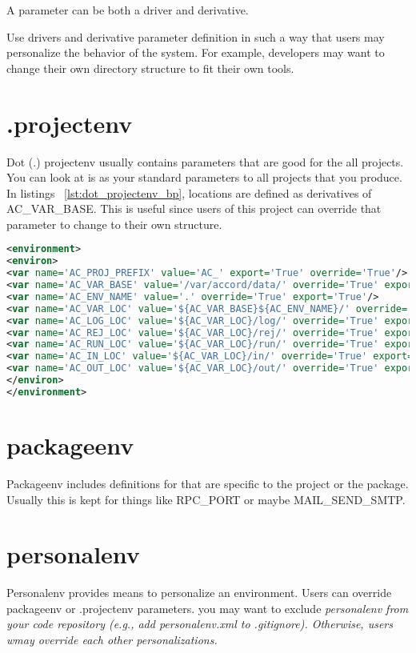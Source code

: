 \documentclass[design.tex]{subfiles}
\begin{document}
A parameter can be both a driver and derivative.

Use drivers and derivative parameter definition in such a way that users may personalize the behavior of the system.  For example, developers may want to change their own directory structure to fit their own tools.
 

\section{.projectenv}
Dot (.) projectenv usually contains parameters that are good for the all projects.  You can look at is as your standard parameters to all projects that you produce. In listings ~\ref{lst:dot_projectenv_bp}, locations are defined as derivatives of AC\_VAR\_BASE. This is useful since users of this project can override that parameter to change to their own structure.

\begin{lstlisting}[language=XML, label=lst:dot_projectenv_bp, caption='.projectenv.xml example']
<environment>
<environ>
<var name='AC_PROJ_PREFIX' value='AC_' export='True' override='True'/>
<var name='AC_VAR_BASE' value='/var/accord/data/' override='True' export='True'/>
<var name='AC_ENV_NAME' value='.' override='True' export='True'/>
<var name='AC_VAR_LOC' value='${AC_VAR_BASE}${AC_ENV_NAME}/' override='True' export='True'/>
<var name='AC_LOG_LOC' value='${AC_VAR_LOC}/log/' override='True' export='True'/>
<var name='AC_REJ_LOC' value='${AC_VAR_LOC}/rej/' override='True' export='True'/>
<var name='AC_RUN_LOC' value='${AC_VAR_LOC}/run/' override='True' export='True'/>
<var name='AC_IN_LOC' value='${AC_VAR_LOC}/in/' override='True' export='True'/>
<var name='AC_OUT_LOC' value='${AC_VAR_LOC}/out/' override='True' export='True'/>
</environ>
</environment>
\end{lstlisting}

\section{packageenv}
Packageenv includes definitions for that are specific to the project or the package.  Usually this is kept for things like RPC\_PORT or maybe MAIL\_SEND\_SMTP. 

\section{personalenv}
Personalenv provides means to personalize an environment.  Users can override packageenv or .projectenv parameters.
you may want to exclude \em{personalenv} from your code repository (e.g., add personalenv.xml to .gitignore).  Otherwise, users wmay override each other personalizations. 
\end{document}
